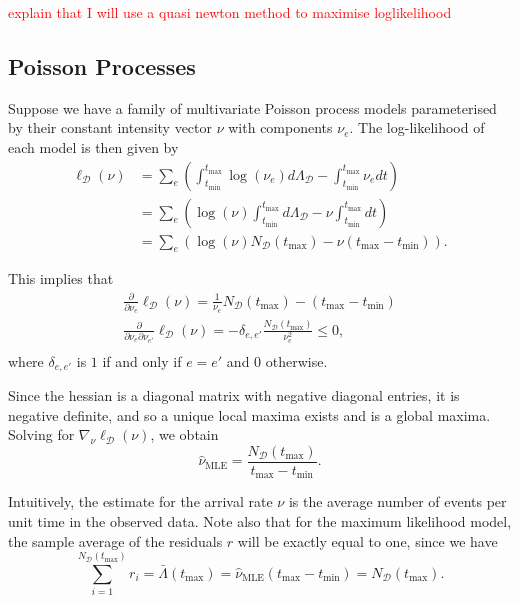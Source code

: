 \documentclass[honours,12pt]{unswthesis}
\numberwithin{equation}{section}
\begin{document}
\textcolor{red}{explain that I will use a quasi newton method to maximise loglikelihood}

\subsection{Poisson Processes}
Suppose we have a family of multivariate Poisson process models parameterised by their constant intensity vector $\nu$ with components $\nu_e$. The log-likelihood of each model is then given by
\begin{equation}
	\begin{align}
		\ell_\mathcal{D}(\nu) &= \sum_e \left(\int_{t_\mathrm{min}}^{t_\mathrm{max}}\log(\nu_e)d\Lambda_\mathcal{D}-\int_{t_\mathrm{min}}^{t_\mathrm{max}}\nu_e dt\right)\\
		&= \sum_e \left( \log(\nu)\int_{t_\mathrm{min}}^{t_\mathrm{max}}d\Lambda_\mathcal{D} - \nu\int_{t_\mathrm{min}}^{t_\mathrm{max}}dt \right)\\
		&= \sum_e \left(\log(\nu)N_\mathcal{D}\left(t_\mathrm{max}\right) - \nu\left(t_\mathrm{max}-t_\mathrm{min}\right)\right).
	\end{align}
\end{equation}

This implies that
\begin{equation}
	\begin{align}
		\frac{\partial}{\partial\nu_e}\ell_\mathcal{D}(\nu) = \frac{1}{\nu_e}N_\mathcal{D}\left(t_\mathrm{max}\right)-\left(t_\mathrm{max}-t_\mathrm{min}\right) \\
		\frac{\partial}{\partial\nu_e\partial\nu_{e'}}\ell_\mathcal{D}(\nu) = -\delta_{e,e'}\frac{N_\mathcal{D}\left(t_\mathrm{max}\right)}{\nu_e^2} \leq 0, \\
	\end{align}
\end{equation}
where $\delta_{e,e'}$ is $1$ if and only if $e=e'$ and $0$ otherwise.

Since the hessian is a diagonal matrix with negative diagonal entries, it is negative definite, and so a unique local maxima exists and is a global maxima. Solving for $\nabla_\nu \ell_\mathcal{D}(\nu)$, we obtain
\begin{equation}
	\hat\nu_\mathrm{MLE} = \frac{N_\mathcal{D}(t_\mathrm{max})}{t_\mathrm{max}-t_\mathrm{min}}.
\end{equation}

Intuitively, the estimate for the arrival rate $\nu$ is the average number of events per unit time in the observed data. Note also that for the maximum likelihood model, the sample average of the residuals $r$ will be exactly equal to one, since we have
$$\sum_{i=1}^{N_\mathcal{D}(t_\mathrm{max})} r_i = \bar\Lambda(t_\mathrm{max})=\hat\nu_\mathrm{MLE}(t_\mathrm{max}-t_\mathrm{min}) =N_\mathcal{D}(t_\mathrm{max}).$$
\end{document}
